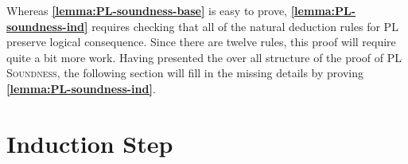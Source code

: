   Whereas \textbf{\ref{lemma:PL-soundness-base}} is easy to prove, \textbf{\ref{lemma:PL-soundness-ind}} requires checking that all of the natural deduction rules for PL preserve logical consequence.
  Since there are twelve rules, this proof will require quite a bit more work.
  Having presented the over all structure of the proof of \textsc{PL Soundness}, the following section will fill in the missing details by proving \textbf{\ref{lemma:PL-soundness-ind}}.






\section{Induction Step}%
  \label{sec:PL-rules}

